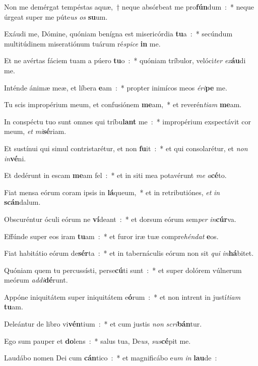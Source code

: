 \item Non me demérgat tempéstas aquæ,~† neque absórbeat me pro\textbf{fún}dum~:~* neque úrgeat super me púte\emph{us} \emph{os} \textbf{su}um.
\item Exáudi me, Dómine, quóniam benígna est misericórdia \textbf{tu}a~:~* secúndum multitúdinem miseratiónum tuárum ré\emph{spi}\emph{ce} \textbf{in} me.
\item Et ne avértas fáciem tuam a púero \textbf{tu}o~:~* quóniam tríbulor, velóci\emph{ter} \emph{ex}\textbf{áu}di me.
\item Inténde ánimæ meæ, et líbera \textbf{e}am~:~* propter inimícos meos \emph{é}\emph{ri}\textbf{pe} me.
\item Tu scis impropérium meum, et confusiónem \textbf{me}am,~* et reverén\emph{ti}\emph{am} \textbf{me}am.
\item In conspéctu tuo sunt omnes qui tríbu\textbf{lant} me~:~* impropérium exspectávit cor meum, \emph{et} \emph{mi}\textbf{sé}riam.
\item Et sustínui qui simul contristarétur, et non \textbf{fu}it~:~* et qui consolarétur, et \emph{non} \emph{in}\textbf{vé}ni.
\item Et dedérunt in escam \textbf{me}am fel~:~* et in siti mea potavérunt \emph{me} \emph{a}\textbf{cé}to.
\item Fiat mensa eórum coram ipsis in \textbf{lá}queum,~* et in retributiónes, \emph{et} \emph{in} \textbf{scán}dalum.
\item Obscuréntur óculi eórum ne \textbf{ví}deant~:~* et dorsum eórum sem\emph{per} \emph{in}\textbf{cúr}va.
\item Effúnde super eos iram \textbf{tu}am~:~* et furor iræ tuæ compre\emph{hén}\emph{dat} \textbf{e}os.
\item Fiat habitátio eórum de\textbf{sér}ta~:~* et in tabernáculis eórum non sit \emph{qui} \emph{in}\textbf{há}bitet.
\item Quóniam quem tu percussísti, perse\textbf{cú}ti sunt~:~* et super dolórem vúlnerum meórum \emph{ad}\emph{di}\textbf{dé}runt.
\item Appóne iniquitátem super iniquitátem e\textbf{ó}rum~:~* et non intrent in justí\emph{ti}\emph{am} \textbf{tu}am.
\item Deleántur de libro vi\textbf{vén}tium~:~* et cum justis \emph{non} \emph{scri}\textbf{bán}tur.
\item Ego sum pauper et \textbf{do}lens~:~* salus tua, De\emph{us}, \emph{sus}\textbf{cé}pit me.
\item Laudábo nomen Dei cum \textbf{cán}tico~:~* et magnificábo e\emph{um} \emph{in} \textbf{lau}de~:
